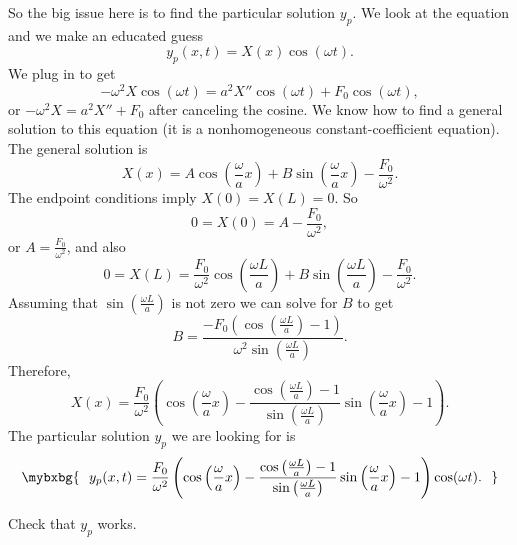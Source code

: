 So the big issue here is to find the particular solution $y_p$.
We look at the equation and we make an educated guess
\begin{equation*}
y_p(x,t) = X(x) \cos (\omega t) .
\end{equation*}
We plug in to get
\begin{equation*}
-\omega^2 X \cos ( \omega t) = a^2 X'' \cos ( \omega t) +
F_0 \cos ( \omega t ) ,
\end{equation*}
or
$-\omega^2 X = a^2 X'' + F_0$ after canceling the cosine.
We know how to find a general solution to this equation (it is a
nonhomogeneous constant-coefficient equation).
The general solution is
\begin{equation*}
X(x) = A \cos \left( \frac{\omega}{a} x \right)
+ B \sin \left( \frac{\omega}{a} x \right) -
\frac{F_0}{\omega^2} .
\end{equation*}
The endpoint conditions imply $X(0) = X(L) = 0$.  So
\begin{equation*}
0 = X(0) = A - \frac{F_0}{\omega^2} ,
\end{equation*}
or $A = \frac{F_0}{\omega^2}$, and also
\begin{equation*}
0 = X(L)
= \frac{F_0}{\omega^2} \cos \left( \frac{\omega L}{a} \right)
+ B \sin \left( \frac{\omega L}{a} \right) -
\frac{F_0}{\omega^2} .
\end{equation*}
Assuming that $\sin ( \frac{\omega L}{a} )$ is not zero we can solve for $B$ to
get
\begin{equation} \label{natfreq:Beq}
B = 
\frac{-F_0 \left( \cos \left( \frac{\omega L}{a} \right) - 1 \right)}%
{\omega^2 \sin \left( \frac{\omega L}{a} \right)}.
\end{equation}
Therefore,
\begin{equation*}
X(x) =
\frac{F_0}{\omega^2} \left(
\cos \left(  \frac{\omega}{a} x \right) -
\frac{\cos \left( \frac{\omega L}{a} \right) - 1}%
{\sin \left( \frac{\omega L}{a} \right)}
\sin \left( \frac{\omega}{a} x \right)
- 1
\right) .
\end{equation*}
The particular solution $y_p$ we are looking for is
\begin{equation*}
\mybxbg{~~
y_p(x,t) =
\frac{F_0}{\omega^2} \left(
\cos \left( \frac{\omega}{a} x \right) -
\frac{\cos \left( \frac{\omega L}{a} \right) - 1}%
{\sin \left( \frac{\omega L}{a}\right)}
\sin \left( \frac{\omega}{a} x \right)
-1
\right)
\cos ( \omega t) .
~~}
\end{equation*}

\begin{exercise}
Check that $y_p$ works.
\end{exercise}

